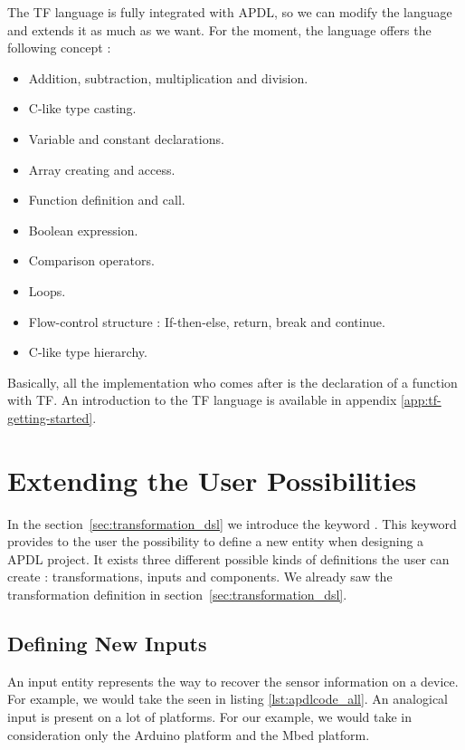 The \gls{TF} language is fully integrated with \gls{APDL}, so we can modify the
language and extends it as much as we want. For the moment, the language offers
the following concept :

\begin{itemize}
\item Addition, subtraction, multiplication and division.
\item C-like type casting.
\item Variable and constant declarations.
\item Array creating and access.
\item Function definition and call.
\item Boolean expression.
\item Comparison operators.
\item Loops.
\item Flow-control structure : If-then-else, return, break and continue.
\item C-like type hierarchy.
\end{itemize}

Basically, all the implementation who comes after 
is the declaration of a function with \gls{TF}. An introduction to the \gls{TF}
language is available in appendix \ref{app:tf-getting-started}.

\section{Extending the User Possibilities}
\label{sec:extending_user_possibilities}

In the section~\ref{sec:transformation_dsl} we introduce the keyword
. This keyword provides to the user the possibility to define
a new entity when designing a \gls{APDL} project. It exists three different
possible kinds of definitions the user can create : transformations, inputs and
components. We already saw the transformation definition in
section~\ref{sec:transformation_dsl}.

\subsection{Defining New Inputs}
\label{sec:defining_new_input}

An input entity represents the way to recover the sensor information on a
device. For example, we would take the  seen in
listing \ref{lst:apdlcode_all}. An analogical input is present on a lot of
platforms. For our example, we would take in consideration only the Arduino
platform\cite{ArduinoSoftware2017} and the Mbed platform\cite{ARMmbed}.

